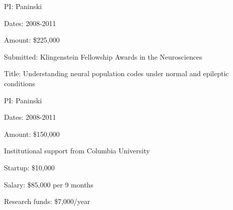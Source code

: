\documentclass[12pt]{article}
\newcommand{\vs}{\vspace{5mm}}
\begin{document}
PI: Paninski

Dates: 2008-2011

Amount: \$225,000


\vs

Submitted: Klingenstein Fellowship Awards in the Neurosciences

Title: Understanding neural population codes under normal
  and epileptic conditions

PI: Paninski

Dates: 2008-2011

Amount: \$150,000


\vs


Institutional support from Columbia University

Startup: \$10,000

Salary: \$85,000 per 9 months

Research funds: \$7,000/year


\vfil \vfil
\end{document}
